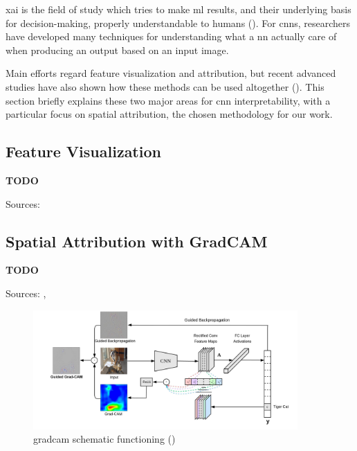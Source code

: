 \medskip

\gls{xai} is the field of study which tries to make \gls{ml} results, and their underlying basis for decision-making, properly understandable to humans (\cite{xai-wiki}). For \gls{cnn}s, researchers have developed many techniques for understanding what a \gls{nn} actually care of when producing an output based on an input image. 

Main efforts regard feature visualization and attribution, but recent advanced studies have also shown how these methods can be used altogether (\cite{olah2018the}). This section briefly explains these two major areas for \gls{cnn} interpretability, with a particular focus on spatial attribution, the chosen methodology for our work.



\subsection{Feature Visualization}

\textbf{TODO}

Sources: \cite{olah2017feature}



\subsection{Spatial Attribution with GradCAM}
\label{subsec:gradcam-theory}

\textbf{TODO}

Sources: \cite{Selvaraju_2019}, \cite{gradcam_medium}

\begin{figure}[!htb]
	\centering
	\includegraphics[width=0.9\textwidth]{"contents/images/gradcam/02-gradcam-schema"}
	\caption[\gls{gradcam} schematic functioning]{\gls{gradcam} schematic functioning (\cite{Selvaraju_2019})}
	\label{fig:gradcam-schema}
\end{figure}

